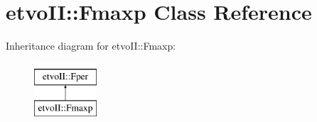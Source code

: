 \hypertarget{classetvo_i_i_1_1_fmaxp}{}\section{etvo\+II\+:\+:Fmaxp Class Reference}
\label{classetvo_i_i_1_1_fmaxp}
Inheritance diagram for etvo\+II\+:\+:Fmaxp\+:\begin{figure}[H]
\begin{center}
\leavevmode
\includegraphics[height=2.000000cm]{classetvo_i_i_1_1_fmaxp}
\end{center}
\end{figure}

